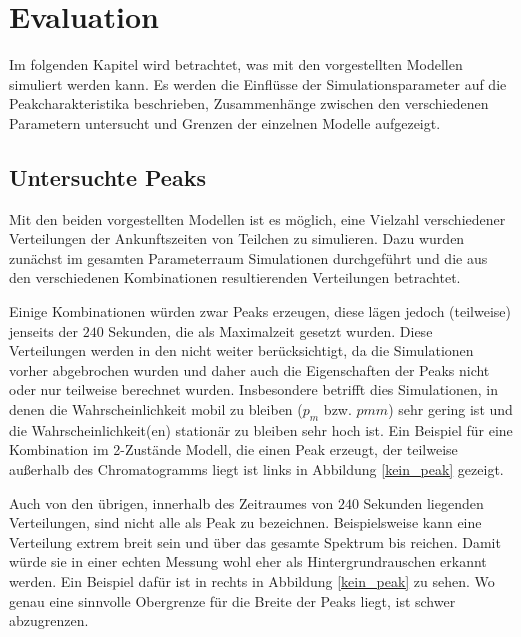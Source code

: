 
\chapter{Evaluation}
\label{chapter:eva}

Im folgenden Kapitel wird betrachtet, was mit den vorgestellten Modellen simuliert werden kann. Es werden die Einflüsse der Simulationsparameter auf die Peakcharakteristika beschrieben, Zusammenhänge zwischen den verschiedenen Parametern untersucht und Grenzen der einzelnen Modelle aufgezeigt.


\section{Untersuchte Peaks}
Mit den beiden vorgestellten Modellen ist es möglich, eine Vielzahl verschiedener Verteilungen der Ankunftszeiten von Teilchen zu simulieren. 
Dazu wurden zunächst im gesamten Parameterraum Simulationen durchgeführt und die aus den verschiedenen Kombinationen resultierenden Verteilungen betrachtet.

Einige Kombinationen würden zwar Peaks erzeugen, diese lägen jedoch (teilweise) jenseits der $240$ Sekunden, die als Maximalzeit gesetzt wurden. Diese Verteilungen werden in den nicht weiter berücksichtigt, da die Simulationen vorher abgebrochen wurden und daher auch die Eigenschaften der Peaks nicht oder nur teilweise berechnet wurden. Insbesondere betrifft dies Simulationen, in denen die Wahrscheinlichkeit mobil zu bleiben ($p_m$ bzw. $pmm$) sehr gering ist und die Wahrscheinlichkeit(en) stationär zu bleiben sehr hoch ist. Ein Beispiel für eine Kombination im 2-Zustände Modell, die einen Peak erzeugt, der teilweise außerhalb des Chromatogramms liegt ist links in Abbildung \ref{kein_peak} gezeigt.

Auch von den übrigen, innerhalb des Zeitraumes von $240$ Sekunden liegenden Verteilungen, sind nicht alle als Peak zu bezeichnen. Beispielsweise kann eine Verteilung extrem breit sein und über das gesamte Spektrum bis reichen. Damit würde sie in einer echten Messung wohl eher als Hintergrundrauschen erkannt werden. Ein Beispiel dafür ist in rechts in Abbildung \ref{kein_peak} zu sehen.
Wo genau eine sinnvolle Obergrenze für die Breite der Peaks liegt, ist schwer abzugrenzen. 

